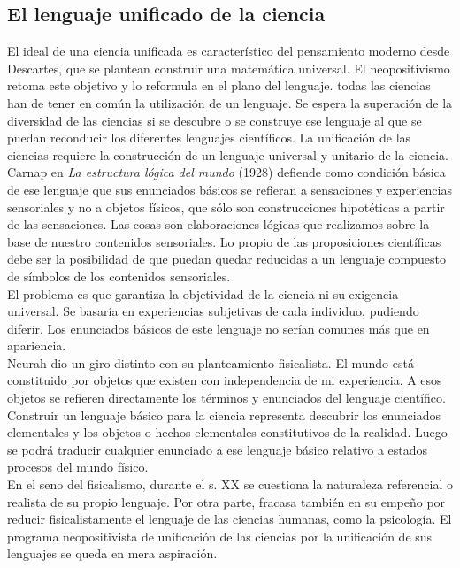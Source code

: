 \documentclass[a4paper, 11pt, twocolumn, spanish]{article}
\begin{document}
\subsection{El lenguaje unificado de la ciencia}
\label{sec:org50edc5d}
El ideal de una ciencia unificada es característico del pensamiento
moderno desde Descartes, que se plantean construir una matemática
universal. El neopositivismo retoma este objetivo y lo reformula en el
plano del lenguaje. todas las ciencias han de tener en común la
utilización de un lenguaje. Se espera la superación de la diversidad
de las ciencias si se descubre o se construye ese lenguaje al que se
puedan reconducir los diferentes lenguajes científicos. La unificación
de las ciencias requiere la construcción de un lenguaje universal y
unitario de la ciencia.\\[0pt]

Carnap en \emph{La estructura lógica del mundo} (1928) defiende como
condición básica de ese lenguaje que sus enunciados básicos se
refieran a sensaciones y experiencias sensoriales y no a objetos
físicos, que sólo son construcciones hipotéticas a partir de las
sensaciones. Las cosas son elaboraciones lógicas que realizamos sobre
la base de nuestro contenidos sensoriales. Lo propio de las
proposiciones científicas debe ser la posibilidad de que puedan quedar
reducidas a un lenguaje compuesto de símbolos de los contenidos
sensoriales.\\[0pt]

El problema es que garantiza la objetividad de la ciencia ni su
exigencia universal. Se basaría en experiencias subjetivas de cada
individuo, pudiendo diferir. Los enunciados básicos de este lenguaje
no serían comunes más que en apariencia.\\[0pt]
Neurah dio un giro distinto con su planteamiento fisicalista. El mundo
está constituido por objetos que existen con independencia de mi
experiencia. A esos objetos se refieren directamente los términos y
enunciados del lenguaje científico. Construir un lenguaje básico para
la ciencia representa descubrir los enunciados elementales y los
objetos o hechos elementales constitutivos de la realidad. Luego se
podrá traducir cualquier enunciado a ese lenguaje básico relativo a
estados  procesos del mundo físico.\\[0pt]

En el seno del fisicalismo, durante el s. XX se cuestiona la
naturaleza referencial o realista de su propio lenguaje. Por otra
parte, fracasa también en su empeño por reducir fisicalistamente el
lenguaje de las ciencias humanas, como la psicología. El programa
neopositivista de unificación de las ciencias por la unificación de
sus lenguajes se queda en mera aspiración.
\end{document}
